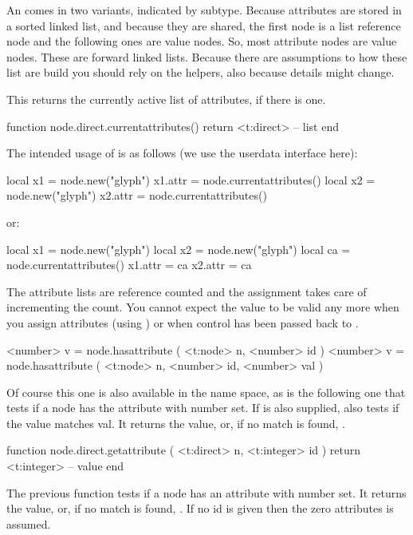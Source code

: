 An  comes in two variants, indicated by subtype. Because
attributes are stored in a sorted linked list, and because they are shared, the
first node is a list reference node and the following ones are value nodes. So,
most attribute nodes are value nodes. These are forward linked lists. Because
there are assumptions to how these list are build you should rely on the helpers,
also because details might change.

This returns the currently active list of attributes, if there is one.

\starttyping[option=LUA]
function node.direct.currentattributes()
    return <t:direct> -- list
end
\stoptyping

The intended usage of  is as follows (we use the userdata
interface here):

\starttyping[option=LUA]
local x1 = node.new("glyph")
x1.attr = node.currentattributes()
local x2 = node.new("glyph")
x2.attr = node.currentattributes()
\stoptyping

or:

\starttyping[option=LUA]
local x1 = node.new("glyph")
local x2 = node.new("glyph")
local ca = node.currentattributes()
x1.attr = ca
x2.attr = ca
\stoptyping

The attribute lists are reference counted and the assignment takes care of
incrementing the count. You cannot expect the value  to be valid any
more when you assign attributes (using ) or when control
has been passed back to \TEX.

\starttyping[option=LUA]
<number> v = node.hasattribute ( <t:node> n, <number> id )
<number> v = node.hasattribute ( <t:node> n, <number> id, <number> val )
\stoptyping

Of course this one is also available in the  name space, as is
the following one that tests if a node has the attribute with number 
set. If  is also supplied, also tests if the value matches \type
{val}. It returns the value, or, if no match is found, .

\starttyping[option=LUA]
function node.direct.getattribute ( <t:direct> n, <t:integer> id )
    return <t:integer> -- value
end
\stoptyping

The previous function tests if a node has an attribute with number 
set. It returns the value, or, if no match is found, . If no \type
{id} is given then the zero attributes is assumed.

